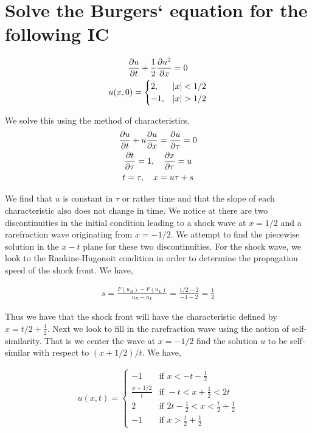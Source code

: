 \documentclass{article}
\begin{document}
\section{Solve the Burgers` equation for the following IC}
\begin{gather*}
    \frac{\partial u}{\partial t} + \frac{1}{2}\frac{\partial u^2}{\partial x} = 0 \\
    u(x,0) = \begin{cases}
        2, & |x| < 1/2\\
        -1, & |x|  > 1/2
        \end{cases}
\end{gather*}

We solve this using the method of characteristics. 
\begin{gather}
    \frac{\partial u}{\partial t} + u\frac{\partial u}{\partial x} = \frac{\partial u}{\partial \tau} = 0\\
    \frac{\partial t}{\partial \tau} = 1, \quad \frac{\partial x}{\partial \tau} = u\\
    t = \tau, \quad x = u\tau + s
\end{gather}

We find that $u$ is constant in $\tau$ or rather time and that the slope of each
characteristic also does not change in time. We notice at there are two discontinuities in the initial condition leading to a
shock wave at $x = 1/2$ and a rarefraction wave originating from $x = -1/2$. We
attempt to find the piecewise solution in the $x-t$ plane for these two
discontinuities. For the shock wave, we look to the Rankine-Hugonoit condition
in order to determine the propagation speed of the shock front. We have, 

\begin{gather*}
    s = \frac{F(u_R) - F(u_L)}{u_R - u_L} = \frac{1/2 - 2}{-1 - 2} = 
    \frac{1}{2}
\end{gather*}

Thus we have that the shock front will have the characteristic defined by $x =
t/2 + \frac{1}{2}$. Next we look to fill in the rarefraction wave using the
notion of self-similarity. That is we center the wave at $x = -1/2$ find the
solution $u$ to be self-similar with respect to $(x+1/2)/t$. We have, 

\begin{gather*}
    u(x,t) = \begin{cases}
                -1 & \text{if } x < -t - \frac{1}{2}\\
                \frac{x+1/2}{t} & \text{if } -t < x+\frac{1}{2} < 2t\\
                2 & \text{if } 2t - \frac{1}{2} < x < \frac{t}{2} + \frac{1}{2}\\
                -1 & \text{if } x > \frac{t}{2} + \frac{1}{2}\end{cases}
\end{gather*}
\end{document}
